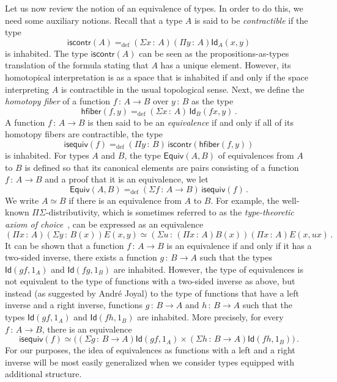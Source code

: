 \documentclass[10pt,a4paper,oneside,reqno]{amsart}
\numberwithin{equation}{section}
\theoremstyle{mythm}
\theoremstyle{mydef}
\theoremstyle{myrmk}
\newcommand{\ie}{\text{i.e.\ }}
\newcommand{\defeq}{=_{\mathrm{def}}}
\newcommand{\co}{\,{:}\,}
\newcommand{\hfiber}{\mathsf{hfiber}}
\newcommand{\iscontr}{\mathsf{iscontr}}
\newcommand{\isequiv}{\mathsf{isequiv}}
\newcommand{\Eq}{\mathsf{Equiv}}
\newcommand{\Id}{\mathsf{Id}}
\begin{document}
Let us now review the notion of an equivalence of types. In order to do this, we need some auxiliary notions. Recall that a type $A$ is said to be \emph{contractible} if the  type 
 \begin{equation}
 \label{eq:contractible}
\iscontr(A) \defeq (\Sigma x\co A) (\Pi y\co A) \Id_A(x,y)
\end{equation}
is inhabited. The type $\iscontr(A)$ can be seen as the propositions-as-types translation
of the formula stating that $A$ has a unique element. However, its homotopical interpretation 
is as a space that is inhabited if and only if the space interpreting $A$ is contractible in the usual
topological sense. Next, we define the \emph{homotopy fiber} of a function $f \co A \to B$ over $y \co B$ as the type
\[
 \hfiber(f,y) \defeq (\Sigma x \co A)\, \Id_B(f x, y) \, .
\]
A function $f \co A \to B$ is then  said to be an \emph{equivalence} if and only if all of its homotopy fibers are contractible, \ie the type
\[
\isequiv(f) \defeq (\Pi y \co B) \, \iscontr(\hfiber(f,y)) 
\]
is inhabited.  For types $A$ and $B$, the type $\Eq(A,B)$ of equivalences from $A$ to $B$ is  defined so that its canonical elements are pairs consisting of a function $f \co A \to B$ and a proof that it is an equivalence, \ie we let 
 \begin{equation}
 \label{equ:weq}
 \Eq(A,B) \defeq (\Sigma f \co A \to B) \, \isequiv(f) \, .
 \end{equation}
 We write $A\simeq B$ if there is an equivalence from $A$ to $B$. For example, the well-known $\Pi\Sigma$-distributivity, which is sometimes referred to as the \emph{type-theoretic axiom of choice}~\cite{MartinLofP:inttt}, can be expressed as an equivalence 
 \begin{equation}
 \label{equ:ac}
 (\Pi x \co A)(\Sigma y \co B(x)) E(x,y) \simeq 
 (\Sigma u  \co (\Pi x \co A)B(x)) (\Pi x \co A) E(x, ux) \, .
 \end{equation}
 It can be shown that a function $f \co A \rightarrow B$ is an equivalence if and only if it has a two-sided inverse,
 \ie there exists a function $g \co B \to A$ such that the types $\Id(gf, 1_A)$
 and $\Id(fg, 1_B)$ are inhabited. However, the type of equivalences is not equivalent to
 the type of functions with a two-sided inverse as above, but instead (as suggested by Andr\'e Joyal) 
to the type of functions that have a left inverse and a right inverse, \ie functions
$g \co B \to A$ and $h \co B \to A$ such that the  types $ \Id(g  f, 1_A)$ and $\Id(f h, 1_B)$ are inhabited. 
More precisely, for every $f \co A \to B$, there is an equivalence
\begin{equation}
\label{equ:equivalternative}
\isequiv(f) \simeq 
 \big( 
 (\Sigma g \co B \to A) \Id(gf, 1_A) \times (\Sigma h \co B \to A) \Id(fh, 1_B) 
 \big) \, .
 \end{equation}
For our purposes, the idea of equivalences as functions with a left and a right inverse will be most
easily generalized when we consider types equipped with additional structure.
\end{document}
